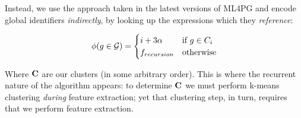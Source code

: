 Instead, we use the approach taken in the latest versions of ML4PG and encode global identifiers \emph{indirectly}, by looking up the expressions which they \emph{reference}:

\begin{equation} \label{eq:globalfeature}
  \phi(g \in \mathcal{G}) =
    \begin{cases}
      i + 3 \alpha \quad & \text{if $g \in C_i$} \\
      f_{recursion}         & \text{otherwise}
    \end{cases}
\end{equation}

Where $\mathbf{C}$ are our clusters (in some arbitrary order). This is where the recurrent nature of the algorithm appears: to determine $\mathbf{C}$ we must perform k-means clustering \emph{during} feature extraction; yet that clustering step, in turn, requires that we perform feature extraction.

